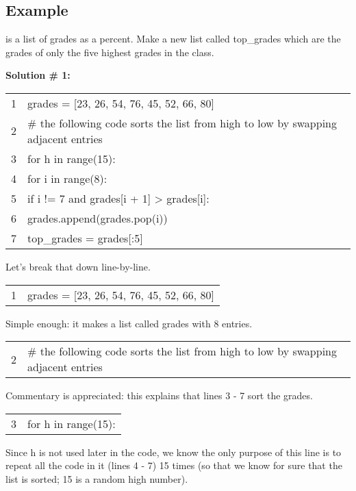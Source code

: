 \documentclass{article}
\newcommand{\icode}[1]{{\ttfamily #1}}
\newenvironment{code}{\begin{tcolorbox}\ttfamily}{\end{tcolorbox}}
\begin{document}
\subsection{Example}
\noindent \icode{grades} is a list of grades as a percent. Make a new list called \icode{top\_grades} which are the grades of only the five highest grades in the class.
\vspace{1 mm}

\noindent\textbf{Solution \# 1:}
\begin{code}
	\begin{tabular}{l|l}
		1&grades = [23, 26, 54, 76, 45, 52, 66, 80]\\
		2&\# the following code sorts the list from high to low by swapping adjacent entries\\
		3&for h in range(15): \\
		4&\hspace{2 em}for i in range(8): \\
		5&\hspace{4 em}if i != 7 and grades[i + 1] > grades[i]:\\
		6& \hspace{6 em}grades.append(grades.pop(i))\\
		7& top\_grades = grades[:5]
	\end{tabular}
\end{code}
\noindent Let's break that down line-by-line.
\vspace{.5 cm}

\begin{code}
	\begin{tabular}{l|l}
		1&grades = [23, 26, 54, 76, 45, 52, 66, 80]
	\end{tabular}
\end{code}
Simple enough: it makes a list called \icode{grades} with 8 entries.

\begin{code}
	\begin{tabular}{l|l}
		2&\# the following code sorts the list from high to low by swapping adjacent entries
	\end{tabular}
\end{code}
Commentary is appreciated: this explains that lines 3 - 7 sort the grades.

\begin{code}
	\begin{tabular}{l|l}
		3&for h in range(15):
	\end{tabular}
\end{code}
Since \icode{h} is not used later in the code, we know the only purpose of this line is to repeat all the code in it (lines 4 - 7) 15 times (so that we know for sure that the list is sorted; 15 is a random high number).
\end{document}
